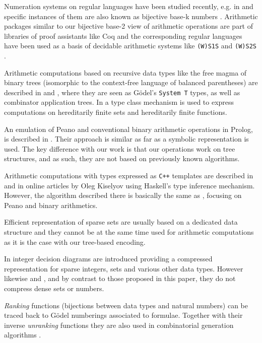 \documentclass{TOOLS/llncs}
\begin{document}
Numeration systems on regular languages have been studied
recently, e.g. in \cite{Rigo2001469} and specific instances
of them are also known as 
bijective base-k numbers \cite{wiki:bijbase}.
Arithmetic packages similar to 
our bijective base-2 view of arithmetic operations
are part of libraries of proof assistants
like Coq \cite{Coq:manual} and the
corresponding regular 
languages have been used as a basis
of decidable arithmetic systems like
{\tt (W)S1S} \cite{buchi62} and {\tt (W)S2S} 
\cite{Rabin69Decidability}.

Arithmetic computations based
on recursive data types like
the free magma of binary trees
(isomorphic to the 
context-free language of balanced parentheses)
are described in \cite{sac12} and \cite{padl12},
where they are seen as G\"odel's {\tt System T} types,
as well as combinator application trees.
In \cite{ppdp10tarau}
a type class mechanism is used
to express computations on hereditarily
finite sets and hereditarily finite
functions.

An emulation of Peano and conventional binary arithmetic operations
in Prolog, is described in \cite{DBLP:conf/flops/KiselyovBFS08}.
Their approach is similar as far as a symbolic representation is used.
The key difference with our work is that our operations work on tree
structures, and as such, they are not based on previously known algorithms.

Arithmetic computations with types expressed as {\tt C++} templates
are described in \cite{DBLP:journals/corr/cs-CL-0104010} and in
online articles by Oleg Kiselyov using Haskell's
type inference mechanism. However, the algorithm described there is
basically the same as \cite{DBLP:conf/flops/KiselyovBFS08}, focusing
on Peano and binary arithmetics.

Efficient representation of sparse sets are usually based on a dedicated
data structure \cite{Briggs93anefficient} and they cannot be 
at the same time used for arithmetic computations as it is 
the case with our tree-based encoding.

In \cite{vu09} integer decision diagrams are introduced
providing a compressed representation for sparse
integers, sets and various other data types. 
However likewise \cite{sac12} 
and \cite{ppdp10tarau}, and by contrast to those
proposed in this paper, they do not compress
dense sets or numbers.

{\em Ranking} functions (bijections between data types and natural numbers)
can be traced back to G\"{o}del numberings
\cite{Goedel:31} associated to formulae. 
Together with their inverse {\em unranking} functions they are also 
used in combinatorial generation
algorithms
\cite{conf/mfcs/MartinezM03,knuth06draft}.
\end{document}
